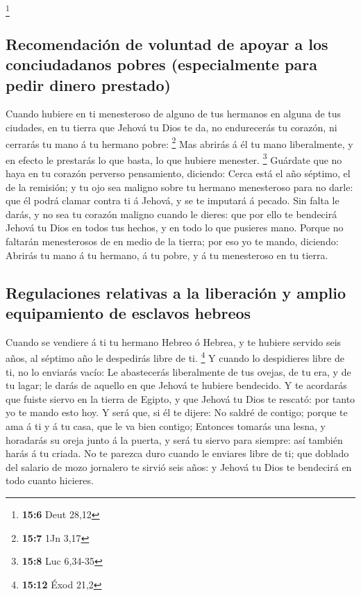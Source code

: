 \footnote{\textbf{15:6} Deut 28,12}

\hypertarget{recomendaciuxf3n-de-voluntad-de-apoyar-a-los-conciudadanos-pobres-especialmente-para-pedir-dinero-prestado}{%
\subsection{Recomendación de voluntad de apoyar a los conciudadanos
pobres (especialmente para pedir dinero
prestado)}\label{recomendaciuxf3n-de-voluntad-de-apoyar-a-los-conciudadanos-pobres-especialmente-para-pedir-dinero-prestado}}

 Cuando hubiere en ti menesteroso de alguno de tus hermanos
en alguna de tus ciudades, en tu tierra que Jehová tu Dios te da, no
endurecerás tu corazón, ni cerrarás tu mano á tu hermano pobre:
\footnote{\textbf{15:7} 1Jn 3,17}  Mas abrirás á él tu mano
liberalmente, y en efecto le prestarás lo que basta, lo que hubiere
menester. \footnote{\textbf{15:8} Luc 6,34-35}  Guárdate que
no haya en tu corazón perverso pensamiento, diciendo: Cerca está el año
séptimo, el de la remisión; y tu ojo sea maligno sobre tu hermano
menesteroso para no darle: que él podrá clamar contra ti á Jehová, y se
te imputará á pecado.  Sin falta le darás, y no sea tu
corazón maligno cuando le dieres: que por ello te bendecirá Jehová tu
Dios en todos tus hechos, y en todo lo que pusieres mano. 
Porque no faltarán menesterosos de en medio de la tierra; por eso yo te
mando, diciendo: Abrirás tu mano á tu hermano, á tu pobre, y á tu
menesteroso en tu tierra.

\hypertarget{regulaciones-relativas-a-la-liberaciuxf3n-y-amplio-equipamiento-de-esclavos-hebreos}{%
\subsection{Regulaciones relativas a la liberación y amplio equipamiento
de esclavos
hebreos}\label{regulaciones-relativas-a-la-liberaciuxf3n-y-amplio-equipamiento-de-esclavos-hebreos}}

 Cuando se vendiere á ti tu hermano Hebreo ó Hebrea, y te
hubiere servido seis años, al séptimo año le despedirás libre de ti.
\footnote{\textbf{15:12} Éxod 21,2}  Y cuando lo
despidieres libre de ti, no lo enviarás vacío:  Le
abastecerás liberalmente de tus ovejas, de tu era, y de tu lagar; le
darás de aquello en que Jehová te hubiere bendecido.  Y te
acordarás que fuiste siervo en la tierra de Egipto, y que Jehová tu Dios
te rescató: por tanto yo te mando esto hoy.  Y será que, si
él te dijere: No saldré de contigo; porque te ama á ti y á tu casa, que
le va bien contigo;  Entonces tomarás una lesna, y
horadarás su oreja junto á la puerta, y será tu siervo para siempre: así
también harás á tu criada.  No te parezca duro cuando le
enviares libre de ti; que doblado del salario de mozo jornalero te
sirvió seis años: y Jehová tu Dios te bendecirá en todo cuanto hicieres.

